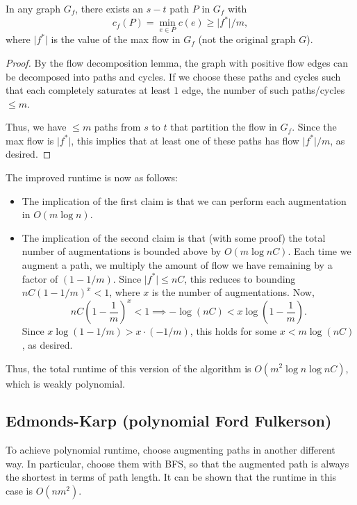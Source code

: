 \begin{theorem}
\claimlabel

In any graph $G_f$, there exists an $s-t$ path $P$ in $G_f$ with 
\[c_f(P)=\min_{e\in P}c(e) \geq \vert f^*\vert/m,\]
where $\vert f^*\vert$ is the value of the max flow in $G_f$ (not the original graph $G$). 
\end{theorem}

\begin{proof}
By the flow decomposition lemma, the graph with positive flow edges can be decomposed into paths and cycles. If we choose these paths and cycles such that each completely saturates at least $1$ edge, the number of such paths/cycles $\leq m$. 

Thus, we have $\leq m$ paths from $s$ to $t$ that partition the flow in $G_f$. Since the max flow is $\vert f^*\vert$, this implies that at least one of these paths has flow $\vert f^*\vert/m$, as desired. 
\end{proof}

The improved runtime is now as follows:
\begin{itemize}
    \item The implication of the first claim is that we can perform each augmentation in $O(m\log n)$.
    \item The implication of the second claim is that (with some proof) the total number of augmentations is bounded above by $O(m\log nC)$. Each time we augment a path, we multiply the amount of flow we have remaining by a factor of $(1-1/m)$. Since $\vert f^*\vert \leq nC$, this reduces to bounding $nC(1-1/m)^x < 1$, where $x$ is the number of augmentations. Now,
    \[nC\left(1-\frac{1}{m}\right)^x < 1\implies -\log(nC) < x\log\left(1-\frac{1}{m}\right).\]
    Since $x\log(1-1/m)>x\cdot (-1/m)$, this holds for some $x < m\log(nC)$, as desired. 
\end{itemize}
 

Thus, the total runtime of this version of the algorithm is $O(m^2\log n\log nC)$, which is \ac{weakly polynomial}. 

\subsection{Edmonds-Karp (polynomial Ford Fulkerson)}

To achieve polynomial runtime, choose augmenting paths in another different way. In particular, choose them with BFS, so that the augmented path is always the shortest in terms of path length. It can be shown that the runtime in this case is $O(nm^2)$. 
